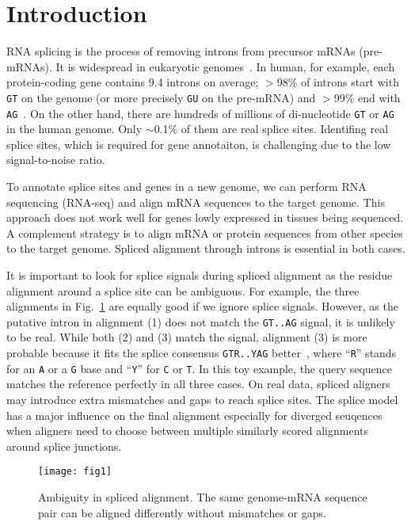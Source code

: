 \documentclass[webpdf,contemporary,large,namedate]{oup-authoring-template}%
\begin{document}
\section{Introduction}

RNA splicing is the process of removing introns from precursor mRNAs (pre-mRNAs).
It is widespread in eukaryotic genomes~\citep{Keren:2010aa}.
In human, for example, each protein-coding gene contains 9.4 introns on average;
$>$98\% of introns start with {\tt GT} on the genome (or more precisely {\tt GU} on the pre-mRNA)
and $>$99\% end with {\tt AG}~\citep{Sibley:2016vh}.
On the other hand, there are hundreds of millions of di-nucleotide {\tt GT} or {\tt AG}
in the human genome.
Only $\sim$0.1\% of them are real splice sites.
Identifing real splice sites, which is required for gene annotaiton,
is challenging due to the low signal-to-noise ratio.

To annotate splice sites and genes in a new genome,
we can perform RNA sequencing (RNA-seq) and align mRNA sequences to the target genome.
This approach does not work well for genes lowly expressed in tissues being sequenced.
A complement strategy is to align mRNA or protein sequences from other species to the target genome.
Spliced alignment through introns is essential in both cases.

It is important to look for splice signals during spliced alignment
as the residue alignment around a splice site can be ambiguous.
For example, the three alignments in Fig.~\ref{fig:1} are equally good if we ignore splice signals.
However, as the putative intron in alignment (1) does not match the {\tt GT..AG}
signal, it is unlikely to be real.
While both (2) and (3) match the signal,
alignment (3) is more probable because it fits the splice consensus {\tt GTR..YAG} better~\citep{Irimia:2008aa,Iwata:2011aa},
where ``{\tt R}'' stands for an {\tt A} or a {\tt G} base and ``{\tt Y}'' for {\tt C} or {\tt T}.
In this toy example, the query sequence matches the reference perfectly in all three cases.
On real data, spliced aligners may introduce extra mismatches and gaps to reach splice sites.
The splice model has a major influence on the final alignment especially for diverged seuqences
when aligners need to choose between multiple similarly scored alignments around splice junctions.

\begin{figure}[b]
\centering
\texttt{[image: fig1]}
\caption{Ambiguity in spliced alignment.
The same genome-mRNA sequence pair can be aligned differently without mismatches or gaps.}\label{fig:1}
\end{figure}
\end{document}
